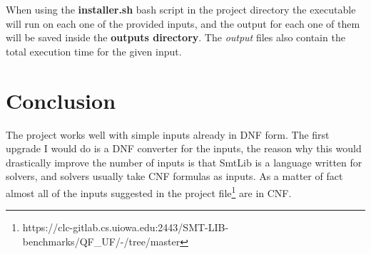 \documentclass[a4paper]{article}
\begin{document}
\newpage
\noindent
When using the \textbf{installer.sh} bash script in the project directory the executable will run on each one of the provided inputs, and the output for each one of them will be saved inside the \textbf{outputs directory}. The \textit{output} files also contain the total execution time for the given input.
\section{Conclusion}
The project works well with simple inputs already in DNF form. The first upgrade I would do is a DNF converter for the inputs, the reason why this would drastically improve the number of inputs is that SmtLib is a language written for solvers, and solvers usually take CNF formulas as inputs. As a matter of fact almost all of the inputs suggested in the project file\footnote{https://clc-gitlab.cs.uiowa.edu:2443/SMT-LIB-benchmarks/QF\_UF/-/tree/master} are in CNF. 
\end{document}
